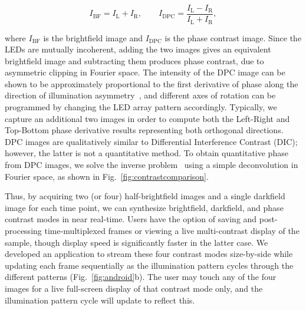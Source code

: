 \begin{equation} 
I_{\mathrm{BF}}=I_\mathrm{L}+I_\mathrm{R}, \qquad I_{\mathrm{DPC}}= \frac{I_\mathrm{L}-I_\mathrm{R}}{I_\mathrm{L}+I_\mathrm{R}},
\label{IBF}
\end{equation}

\noindent where $I_{\mathrm{BF}}$ is the brightfield image and $I_{\mathrm{DPC}}$ is the phase contrast image. Since the LEDs are mutually incoherent, adding the two images gives an equivalent brightfield image and subtracting them produces phase contrast, due to asymmetric clipping in Fourier space. The intensity of the DPC image can be shown to be approximately proportional to the first derivative of phase along the direction of illumination asymmetry~\cite{Hamilton1984a}, and different axes of rotation can be programmed by changing the LED array pattern accordingly. Typically, we capture an additional two images in order to compute both the Left-Right and Top-Bottom phase derivative results representing both orthogonal directions. DPC images are qualitatively similar to Differential Interference Contrast (DIC); however, the latter is not a quantitative method. To obtain quantitative phase from DPC images, we solve the inverse problem~\cite{mehta2009quantitative,tian20153d} using a simple deconvolution in Fourier space, as shown in Fig.~\ref{fig:contrastcomparison}.

Thus, by acquiring two (or four) half-brightfield images and a single darkfield image for each time point, we can synthesize brightfield, darkfield, and phase contrast modes in near real-time. Users have the option of saving and post-processing time-multiplexed frames or viewing a live multi-contrast display of the sample, though display speed is significantly faster in the latter case. We developed an application to stream these four contrast modes size-by-side while updating each frame sequentially as the illumination pattern cycles through the different patterns (Fig.~\ref{fig:android}b). The user may touch any of the four images for a live full-screen display of that contrast mode only, and the illumination pattern cycle will update to reflect this.

